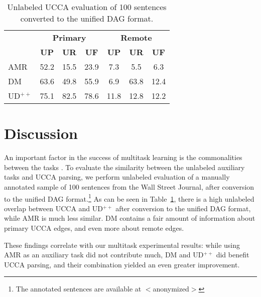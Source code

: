 \documentclass[11pt,a4paper]{article}
\begin{document}
\begin{table}
\begin{tabular}{l|ccc|ccc}
& \multicolumn{3}{c|}{\footnotesize \bf Primary} & \multicolumn{3}{c}{\footnotesize \bf Remote} \\
& \footnotesize \textbf{UP} & \footnotesize \textbf{UR} & \footnotesize \textbf{UF}
& \footnotesize \textbf{UP} & \footnotesize \textbf{UR} & \footnotesize \textbf{UF} \\
\hline
AMR & 52.2 & 15.5 & 23.9 & 7.3 & 5.5 & 6.3 \\
DM & 63.6 & 49.8 & 55.9 & 6.9 & 63.8 & 12.4 \\
UD$^{++}$ & 75.1 & 82.5 & 78.6 & 11.8 & 12.8 & 12.2
\end{tabular}
\caption{Unlabeled UCCA evaluation of 100 sentences converted to the unified DAG format.
\label{tab:common}}
\end{table}


\section{Discussion}\label{sec:discussion}

An important factor in the success of multitask learning is the commonalities between the tasks
\cite{E17-2026,E17-1005}.
To evaluate the similarity between the unlabeled auxiliary tasks and UCCA parsing,
we perform unlabeled evaluation of a manually annotated sample of 100 sentences from the
Wall Street Journal, after conversion to the unified DAG format.\footnote{The annotated
sentences are available at $<$anonymized$>$}
As can be seen in Table~\ref{tab:common}, there is a high unlabeled overlap between
UCCA and UD$^{++}$ after conversion to the unified DAG format,
while AMR is much less similar.
DM contains a fair amount of information about primary UCCA edges, and even more about remote edges.

These findings correlate with our multitask experimental results:
while using AMR as an auxiliary task did not contribute much, DM and UD$^{++}$ did benefit UCCA
parsing, and their combination yielded an even greater improvement.
\end{document}
